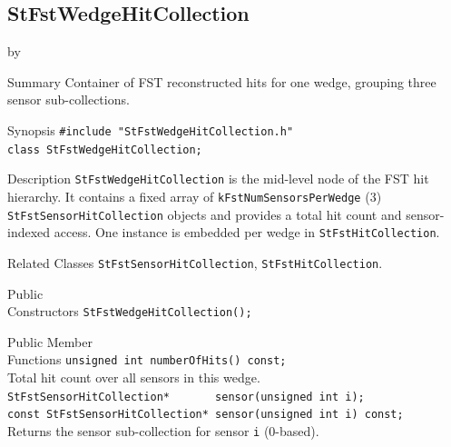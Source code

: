 \documentclass[twoside]{article}
\newcommand{\entrylabel}[1]{\mbox{\textbf{{#1}}}\hfil}%
\newenvironment{entry}
{\begin{list}{}%
    {\renewcommand{\makelabel}{\entrylabel}%
     \setlength{\labelwidth}{90pt}%
     \setlength{\leftmargin}{\labelwidth}
     \advance\leftmargin by \labelsep%
      }%
    }%
  {\end{list}}
\newcommand{\Entrylabel}[1]%
{\raisebox{0pt}[1ex][0pt]{\makebox[\labelwidth][l]%
    {\parbox[t]{\labelwidth}{\hspace{0pt}\textbf{{#1}}}}}}
\newenvironment{Entry}%
{\renewcommand{\entrylabel}{\Entrylabel}\begin{entry}}%
  {\end{entry}}
\begin{document}
\subsection{StFstWedgeHitCollection}
\label{sec:StFstWedgeHitCollection}
\begin{Entry}
\item[Summary] Container of FST reconstructed hits for one wedge, grouping three sensor
  sub-collections.
\item[Synopsis]
    \verb+#include "StFstWedgeHitCollection.h"+\\
    \verb+class StFstWedgeHitCollection;+\\
\item[Description]
  \texttt{StFstWedgeHitCollection} is the mid-level node of the FST hit hierarchy.  It
  contains a fixed array of \texttt{kFstNumSensorsPerWedge} (3)
  \texttt{StFstSensorHitCollection} objects and provides a total hit count and
  sensor-indexed access.  One instance is embedded per wedge in
  \texttt{StFstHitCollection}.
\item[Related Classes]
  \texttt{StFstSensorHitCollection}, \texttt{StFstHitCollection}.
\item[Public\\ Constructors]
    \verb+StFstWedgeHitCollection();+\\
\item[Public Member\\ Functions]
    \verb+unsigned int numberOfHits() const;+\\
    Total hit count over all sensors in this wedge.\\[2pt]
    \verb+StFstSensorHitCollection*       sensor(unsigned int i);+\\
    \verb+const StFstSensorHitCollection* sensor(unsigned int i) const;+\\
    Returns the sensor sub-collection for sensor \texttt{i} (0-based).
\end{Entry}
\clearpage

\end{document}
